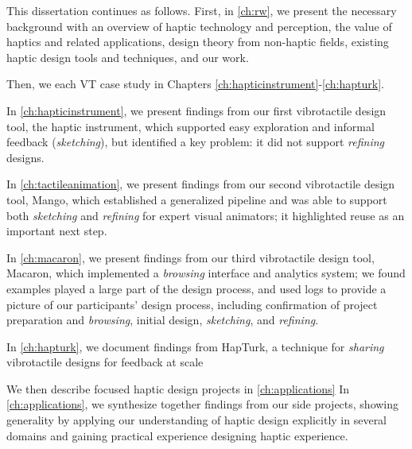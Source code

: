 This dissertation continues as follows.
First, in \autoref{ch:rw}, we present the necessary background with an overview of haptic technology and perception, the value of haptics and related applications,  design theory from non-haptic fields,  existing haptic design tools and techniques, and  our work.

Then, we  %
each VT case study in Chapters \ref{ch:hapticinstrument}-\ref{ch:hapturk}.

In \autoref{ch:hapticinstrument}, we present findings from our first vibrotactile design tool, the haptic instrument, which supported easy exploration and informal feedback (\emph{sketching}), but identified a key problem: it did not support \emph{refining} designs.

In \autoref{ch:tactileanimation}, we present findings from our second vibrotactile design tool, Mango, which established a generalized pipeline and was able to support both \emph{sketching} and \emph{refining} for expert visual animators; it highlighted reuse as an important next step.

In \autoref{ch:macaron}, we present findings from our third vibrotactile design tool, Macaron, which implemented a \emph{browsing} interface and analytics system; we found examples played a large part of the design process, and used  %
logs to provide a picture of our participants' design process, including confirmation of project preparation and \emph{browsing}, initial design, \emph{sketching}, and \emph{refining}.

In \autoref{ch:hapturk}, we document findings from HapTurk, a technique for \emph{sharing} vibrotactile designs for feedback at scale

We then describe focused haptic design projects in \autoref{ch:applications} %
In \autoref{ch:applications}, we synthesize together findings from our side projects, showing generality by applying our understanding of haptic design explicitly in several domains and gaining practical experience designing haptic experience.


